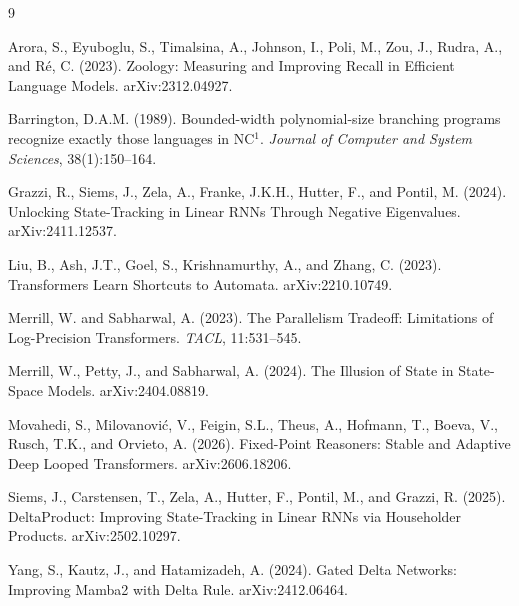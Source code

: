 \documentclass[11pt]{article}
\begin{document}
\begin{thebibliography}{9}

Arora, S., Eyuboglu, S., Timalsina, A., Johnson, I., Poli, M., Zou, J., Rudra, A., and
R\'e, C. (2023). Zoology: Measuring and Improving Recall in Efficient Language Models.
arXiv:2312.04927.

Barrington, D.A.M. (1989). Bounded-width polynomial-size branching programs recognize exactly
those languages in NC$^1$. \emph{Journal of Computer and System Sciences}, 38(1):150--164.

Grazzi, R., Siems, J., Zela, A., Franke, J.K.H., Hutter, F., and Pontil, M. (2024). Unlocking
State-Tracking in Linear RNNs Through Negative Eigenvalues. arXiv:2411.12537.

Liu, B., Ash, J.T., Goel, S., Krishnamurthy, A., and Zhang, C. (2023). Transformers Learn
Shortcuts to Automata. arXiv:2210.10749.

Merrill, W. and Sabharwal, A. (2023). The Parallelism Tradeoff: Limitations of Log-Precision
Transformers. \emph{TACL}, 11:531--545.

Merrill, W., Petty, J., and Sabharwal, A. (2024). The Illusion of State in State-Space Models.
arXiv:2404.08819.

Movahedi, S., Milovanovi\'c, V., Feigin, S.L., Theus, A., Hofmann, T., Boeva, V., Rusch,
T.K., and Orvieto, A. (2026). Fixed-Point Reasoners: Stable and Adaptive Deep Looped
Transformers. arXiv:2606.18206.

Siems, J., Carstensen, T., Zela, A., Hutter, F., Pontil, M., and Grazzi, R. (2025).
DeltaProduct: Improving State-Tracking in Linear RNNs via Householder Products.
arXiv:2502.10297.

Yang, S., Kautz, J., and Hatamizadeh, A. (2024). Gated Delta Networks: Improving Mamba2 with
Delta Rule. arXiv:2412.06464.

\end{thebibliography}
\end{document}
